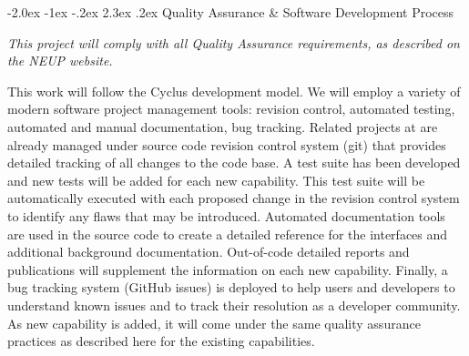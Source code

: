 \documentclass[dvips,11pt]{article}
\makeatletter
\renewcommand\section{\@startsection {section}{1}{\z@}%
                                   {-2.0ex \@plus -1ex \@minus -.2ex}%
                                   {2.3ex \@plus.2ex}%
                                   {\normalfont\bfseries}}%
\makeatother
\begin{document}
\section{Quality Assurance \& Software Development Process}

\textit{This project will comply with all Quality
  Assurance requirements, as described on the NEUP
  website.}  

This work will follow the Cyclus development
model.  We will employ a variety of modern
software project management tools: revision
control, automated testing, automated and manual
documentation, bug tracking. Related projects at
are already managed under source code revision
control system (git) that provides detailed
tracking of all changes to the code base. A test
suite has been developed and new tests will be
added for each new capability. This test suite
will be automatically executed with each proposed
change in the revision control system to identify
any flaws that may be introduced. Automated
documentation tools are used in the source code to
create a detailed reference for the interfaces and
additional background documentation. Out-of-code
detailed reports and publications will supplement
the information on each new capability. Finally, a
bug tracking system (GitHub issues) is deployed to
help users and developers to understand known
issues and to track their resolution as a
developer community. As new capability is added,
it will come under the same quality assurance
practices as described here for the existing
capabilities.







\label{LastPage}
\end{document}
